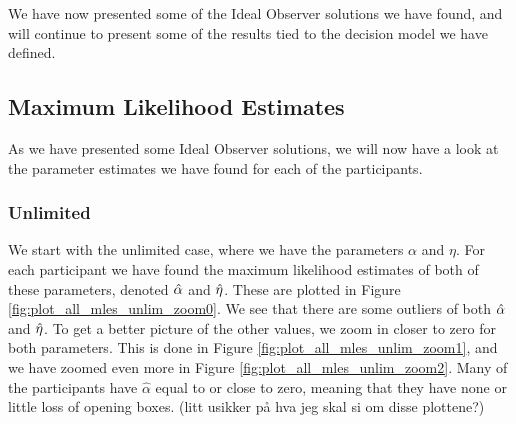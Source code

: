 We have now presented some of the Ideal Observer solutions we have found, and will continue to present some of the results tied to the decision model we have defined. 





\subsection{Maximum Likelihood Estimates}
\label{chapter:mles}
As we have presented some Ideal Observer solutions, we will now have a look at the parameter estimates we have found for each of the participants. 


\subsubsection{Unlimited}
We start with the unlimited case, where we have the parameters $\alpha$ and $\eta$. For each participant we have found the maximum likelihood estimates of both of these parameters, denoted $\hat{\alpha}$ and $\hat{\eta}$. These are plotted in Figure \ref{fig:plot_all_mles_unlim_zoom0}. We see that there are some outliers of both $\hat{\alpha}$ and $\hat{\eta}$. To get a better picture of the other values, we zoom in closer to zero for both parameters. This is done in Figure \ref{fig:plot_all_mles_unlim_zoom1}, and we have zoomed even more in Figure \ref{fig:plot_all_mles_unlim_zoom2}. Many of the participants have $\hat{\alpha}$ equal to or close to zero, meaning that they have none or little loss of opening boxes. 
(litt usikker på hva jeg skal si om disse plottene?)
